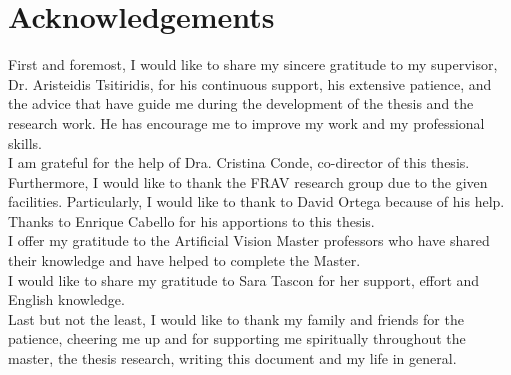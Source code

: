 \chapter*{Acknowledgements} %
First and foremost, I would like to share my sincere gratitude to my supervisor, Dr. Aristeidis Tsitiridis, for his continuous support, his extensive patience, and the advice that have guide me during the development of the thesis and the research work. He has encourage me to improve my work and my professional skills.\\

I am grateful for the help of Dra. Cristina Conde, co-director of this thesis. Furthermore, I would like to thank the FRAV research group due to the given facilities. Particularly, I would like to thank to David Ortega because of his help. Thanks to Enrique Cabello for his apportions to this thesis.\\

I offer my gratitude to the Artificial Vision Master professors who have shared their knowledge and have helped to complete the Master.\\

I would like to share my gratitude to Sara Tascon for her support, effort and English knowledge.\\

Last but not the least, I would like to thank my family and friends for the patience, cheering me up and for supporting me spiritually throughout the master, the thesis research, writing this document and my life in general.
